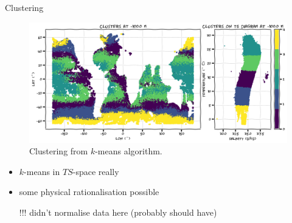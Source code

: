 \documentclass[xcolor=x11names,compress]{beamer}
\renewcommand{\(}{\begin{columns}}
\renewcommand{\)}{\end{columns}}
\newcommand{\<}[1]{\begin{column}{#1}}
\renewcommand{\>}{\end{column}}
\begin{document}

\begin{frame}{Clustering}

\begin{figure}
  \includegraphics[width=\textwidth]{argo_data_Kmean}
  \caption{Clustering from $k$-means algorithm.}
\end{figure}

\begin{itemize}
  \item $k$-means in $TS$-space really
  \item some physical rationalisation possible
  \item[]
  \item[!!!] didn't normalise data here {\tiny (probably should have)}
\end{itemize}

\end{frame}

\end{document}
